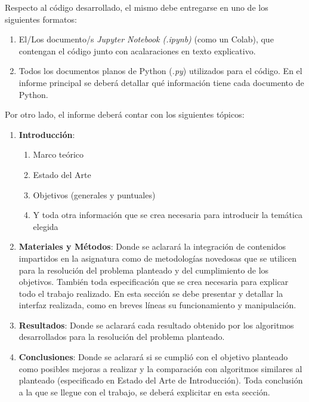 \documentclass[10pt]{article}
\begin{document}
Respecto al código desarrollado, el mismo debe entregarse en uno de los siguientes formatos:

\begin{enumerate}
    \item El/Los documento/s \textit{Jupyter Notebook (.ipynb)} (como un Colab), que contengan el código junto con acalaraciones en texto explicativo. 

    \item Todos los documentos planos de Python (\textit{.py}) utilizados para el código. En el informe principal se deberá detallar qué información tiene cada documento de Python.
\end{enumerate}

\vspace{0.25cm}

Por otro lado, el informe deberá contar con los siguientes tópicos:

\begin{enumerate}
    \item \textbf{Introducción}:
    \begin{enumerate}
        \item Marco teórico
        \item Estado del Arte
        \item Objetivos (generales y puntuales)
        \item Y toda otra información que se crea necesaria para introducir la temática elegida
    \end{enumerate}
    
    \item \textbf{Materiales y Métodos}: Donde se aclarará la integración de contenidos impartidos en la asignatura como de metodologías novedosas que se utilicen para la resolución del problema planteado y del cumplimiento de los objetivos. También toda especificación que se crea necesaria para explicar todo el trabajo realizado. En esta sección se debe presentar y detallar la interfaz realizada, como en breves líneas su funcionamiento y manipulación. 
    \item \textbf{Resultados}: Donde se aclarará cada resultado obtenido por los algoritmos desarrollados para la resolución del problema planteado.
    \item \textbf{Conclusiones}: Donde se aclarará si se cumplió con el objetivo planteado como posibles mejoras a realizar y la comparación con algoritmos similares al planteado (especificado en Estado del Arte de Introducción). Toda conclusión a la que se llegue con el trabajo, se deberá explicitar en esta sección.
    
\end{enumerate}
\end{document}

